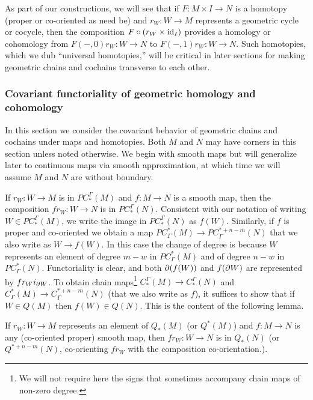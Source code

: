 As part of our constructions, we will see that if $F \colon M \times I \to N$ is a homotopy (proper or co-oriented as need be) and $r_W \colon W \to M$ represents a geometric cycle or cocycle, then the composition $F \circ (r_W \times \mathrm{id}_I)$ provides a homology or cohomology from $F(-,0)r_W \colon W \to N$ to $F(-,1)r_W \colon W \to N$.
Such homotopies, which we dub ``universal homotopies,'' will be critical in later sections for making geometric chains and cochains transverse to each other.

\subsubsection{Covariant functoriality of geometric homology and cohomology}\label{S: covariant functoriality}

In this section we consider the covariant behavior of geometric chains and cochains under maps and homotopies.
Both $M$ and $N$ may have corners in this section unless noted otherwise.
We begin with smooth maps but will generalize later to continuous maps via smooth approximation, at which time we will assume $M$ and $N$ are without boundary.

If $r_W \colon W \to M$ is in $PC_*^\Gamma(M)$ and $f \colon M \to N$ is a smooth map, then the composition $fr_W \colon W \to N$ is in $PC^\Gamma_*(N)$.
Consistent with our notation of writing $W \in PC_*^\Gamma(M)$, we write the image in $PC_*^\Gamma(N)$ as $f(W)$.
Similarly, if $f$ is proper and co-oriented we obtain a map $PC^*_\Gamma(M) \to PC^{*+n-m}_\Gamma(N)$ that we also write as $W \to f(W)$.
In this case the change of degree is because $W$ represents an element of degree $m-w$ in $PC^*_\Gamma(M)$ and of degree $n-w$ in $PC^{*}_\Gamma(N)$.
Functoriality is clear, and both $\partial(f(W))$ and $f(\partial W)$ are represented by $fr_Wi_{\partial W}$.
To obtain chain maps\footnote{We will not require here the signs that sometimes accompany chain maps of non-zero degree.} $C_*^\Gamma(M) \to C_*^\Gamma(N)$ and $C^*_\Gamma(M) \to C^{*+n-m}_\Gamma(N)$
(that we also write as $f$), it suffices to show that if $W \in Q(M)$ then $f(W) \in Q(N)$.
This is the content of the following lemma.

\begin{lemma}\label{L: Q preservation}
	If $r_W \colon W \to M$ represents an element of $Q_*(M)$ (or $Q^*(M)$) and $f \colon M \to N$ is any (co-oriented proper) smooth map, then $fr_W \colon W \to N$ is in $Q_*(N)$ (or $Q^{*+n-m}(N)$, co-orienting $fr_W$ with the composition co-orientation.).
\end{lemma}

